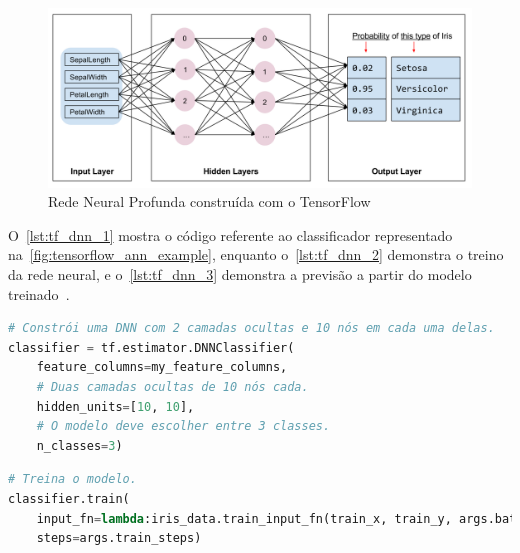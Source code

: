 \begin{figure}[H]
	\caption{\label{fig:tensorflow_ann_example}Rede Neural Profunda construída com o TensorFlow}
	\begin{center}
	    \includegraphics[width=\textwidth]{resources/tensorflow_ann_example}
	\end{center}
\end{figure}

O~\autoref{lst:tf_dnn_1} mostra o código referente ao classificador representado na~\autoref{fig:tensorflow_ann_example}, enquanto o~\autoref{lst:tf_dnn_2} demonstra o treino da rede neural, e o~\autoref{lst:tf_dnn_3} demonstra a previsão a partir do modelo treinado~\cite{tensorflow:premade_estimators}.

\begin{lstfloat}
\begin{lstlisting}[language=Python,caption={Inicializando o classificador no TensorFlow},label={lst:tf_dnn_1}]
# Constrói uma DNN com 2 camadas ocultas e 10 nós em cada uma delas.
classifier = tf.estimator.DNNClassifier(
	feature_columns=my_feature_columns,
	# Duas camadas ocultas de 10 nós cada.
	hidden_units=[10, 10],
	# O modelo deve escolher entre 3 classes.
	n_classes=3)
\end{lstlisting}
\end{lstfloat}

\begin{lstfloat}
\begin{lstlisting}[language=Python,caption={Treinando o classificador no TensorFlow},label={lst:tf_dnn_2}]
# Treina o modelo.
classifier.train(
    input_fn=lambda:iris_data.train_input_fn(train_x, train_y, args.batch_size),
    steps=args.train_steps)
\end{lstlisting}
\end{lstfloat}

